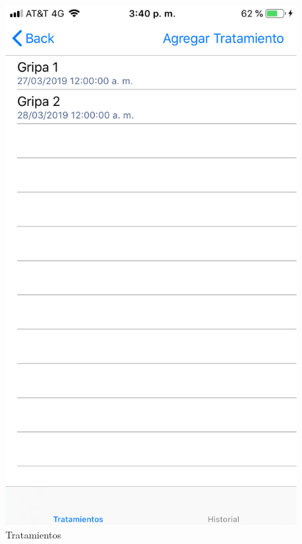 \begin{enumerate}
	\begin{figure}[!htbp]			
		\hypertarget{fig:Tratamientos2}{\hspace{1pt}}
		\begin{center}
			\includegraphics[height=0.4\textheight]{Paciente/InfoTratamiento/images/Tratamientos}
			\caption{Tratamientos}
			\label{fig:Tratamientos2}
		\end{center}
	\end{figure}


\end{enumerate}
